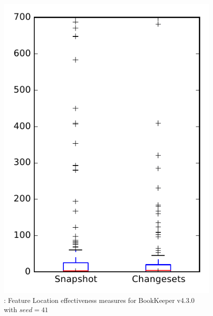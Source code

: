 
\begin{figure}
\centering
\includegraphics[height=0.4\textheight]{figures/flt_seed/rq1_bookkeeper_41}
\caption{\rone: Feature Location effectiveness measures for BookKeeper v4.3.0 with $seed=41$}
\label{fig:flt_seed:rq1:bookkeeper}
\end{figure}
